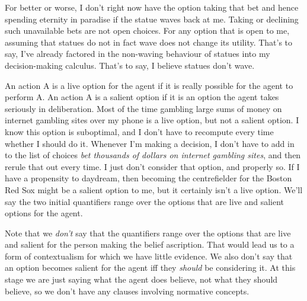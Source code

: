 For better or worse, I don't right now have the option taking that bet and hence spending eternity in paradise if the statue waves back at me. Taking or declining such unavailable bets are not open choices. For any option that is open to me, assuming that statues do not in fact wave does not change its utility. That's to say, I've already factored in the non-waving behaviour of statues into my decision-making calculus. That's to say, I believe statues don't wave.

An action A is a live option for the agent if it is really possible for the agent to perform A. An action A is a salient option if it is an option the agent takes seriously in deliberation. Most of the time gambling large sums of money on internet gambling sites over my phone is a live option, but not a salient option. I know this option is suboptimal, and I don't have to recompute every time whether I should do it. Whenever I'm making a decision, I don't have to add in to the list of choices \textit{bet thousands of dollars on internet gambling sites}, and then rerule that out every time. I just don't consider that option, and properly so. If I have a propensity to daydream, then becoming the centrefielder for the Boston Red Sox might be a salient option to me, but it certainly isn't a live option. We'll say the two initial quantifiers range over the options that are live and salient options for the agent. 

Note that we \textit{don't} say that the quantifiers range over the options that are live and salient for the person making the belief ascription. That would lead us to a form of contextualism for which we have little evidence. We also don't say that an option becomes salient for the agent iff they \textit{should} be considering it. At this stage we are just saying what the agent does believe, not what they should believe, so we don't have any clauses involving normative concepts.

